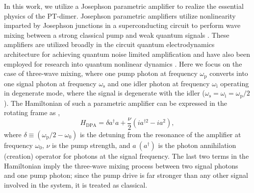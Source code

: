 \documentclass[prl,twocolumn,english,superscriptaddress,floatfix,longbibliography]{revtex4-2}
\begin{document}
In this work, we utilize a Josephson parametric amplifier to realize the essential physics of the PT-dimer. Josephson parametric amplifiers utilize nonlinearity imparted by Josephson junctions in a superconducting circuit to perform wave mixing between a strong classical pump and weak quantum signals \cite{Aumentado2020}. These amplifiers are utilized broadly in the circuit quantum electrodynamics architecture \cite{Blais2021,Kjaergaard2020} for achieving quantum noise limited amplification and have also been employed for research into quantum nonlinear dynamics \cite{Murch2010,Chen2023}. Here we focus on the case of three-wave mixing, where one pump photon at frequency $\omega_\mathrm{p}$ converts into one signal photon at frequency $\omega_\mathrm{s}$ and one idler photon at frequency $\omega_\mathrm{i}$  operating in degenerate mode, where the  signal is degenerate with the idler ($\omega_\mathrm{s} = \omega_\mathrm{i} = \omega_\mathrm{p}/2$). The Hamiltonian of such a parametric amplifier can be expressed in the rotating frame as \cite{Planat2019},
\begin{equation}
     H _\mathrm{DPA} = \delta a^{\dagger}a+ \frac{\nu}{2}(i a^{\dagger 2}-i a^{2}), 
 \end{equation}
where $\delta \equiv (\omega_\mathrm{p}/2-\omega_{0})$ is the detuning from the resonance of the amplifier at frequency $\omega_0$, $\nu$ is the pump strength, and $a\ (a^\dagger)$ is the photon annihilation (creation) operator for photons at the signal frequency. The last two terms in the Hamiltonian imply the three-wave mixing process between two signal photons and one pump photon; since the pump drive is far stronger than any other signal involved in the system, it is treated as classical.






 
\end{document}
